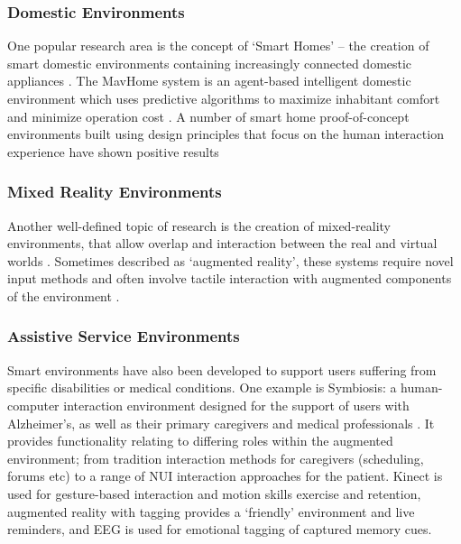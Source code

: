 \documentclass[oribibl,11pt]{llncs}
\begin{document}
\subsubsection{Domestic Environments}		\label{ssub:domestic_environments}
One popular research area is the concept of `Smart Homes' -- the creation of smart domestic environments containing increasingly connected domestic appliances \cite{masinter1998rfc2324}. The MavHome system is an agent-based intelligent domestic environment which uses predictive algorithms to maximize inhabitant comfort and minimize operation cost \cite{das2002role}. A number of smart home proof-of-concept environments built using design principles that focus on the human interaction experience have shown positive results \cite{Surie:2012:SHE:2469451.2469943}

\subsubsection{Mixed Reality Environments}		\label{ssub:mixed_reality_environments}
Another well-defined topic of research is the creation of mixed-reality environments, that allow overlap and interaction between the real and virtual worlds \cite{Carrino:2011:HSE:2070481.2070501}. Sometimes described as `augmented reality', these systems require novel input methods and often involve tactile interaction with augmented components of the environment \cite{kaltenbrunner2007reactivision}.

\subsubsection{Assistive Service Environments}		\label{ssub:assistive_service_environments}
Smart environments have also been developed to support users suffering from specific disabilities or medical conditions. One example is Symbiosis: a human-computer interaction environment designed for the support of users with Alzheimer's, as well as their primary caregivers and medical professionals \cite{Mandiliotis:2013:SIH:2526481.2526496}. It provides functionality relating to differing roles within the augmented environment; from tradition interaction methods for caregivers (scheduling, forums etc) to a range of NUI interaction approaches for the patient. Kinect is used for gesture-based interaction and motion skills exercise and retention, augmented reality with tagging provides a `friendly' environment and live reminders, and EEG is used for emotional tagging of captured memory cues.
\end{document}
